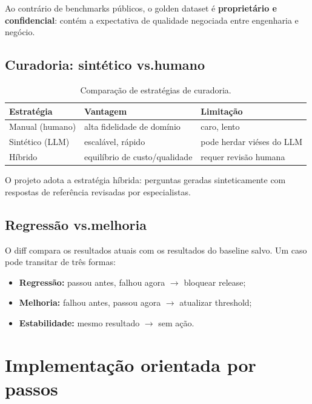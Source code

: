 Ao contr\'ario de benchmarks p\'ublicos, o golden dataset \'e
\textbf{propriet\'ario e confidencial}: cont\'em a expectativa de
qualidade negociada entre engenharia e neg\'ocio.

\subsection{Curadoria: sintético vs.\@ humano}

\begin{table}[htbp]
\centering
\caption{Compara\c{c}\~ao de estrat\'egias de curadoria.}
\label{tab:curadoria}
\begin{tabular}{lll}
\toprule
\textbf{Estrat\'egia} & \textbf{Vantagem} & \textbf{Limita\c{c}\~ao} \\
\midrule
Manual (humano)  & alta fidelidade de dom\'inio  & caro, lento \\
Sint\'etico (LLM) & escal\'avel, r\'apido         & pode herdar vi\'eses do LLM \\
H\'ibrido        & equil\'ibrio de custo/qualidade & requer revis\~ao humana \\
\bottomrule
\end{tabular}
\end{table}

O projeto adota a estrat\'egia h\'ibrida: perguntas geradas
sinteticamente com respostas de refer\^encia revisadas por
especialistas.

\subsection{Regress\~ao vs.\@ melhoria}

O diff compara os resultados atuais com os resultados do baseline
salvo. Um caso pode transitar de tr\^es formas:

\begin{itemize}[leftmargin=*]
  \item \textbf{Regress\~ao:} passou antes, falhou agora
        $\to$ bloquear release;
  \item \textbf{Melhoria:} falhou antes, passou agora
        $\to$ atualizar threshold;
  \item \textbf{Estabilidade:} mesmo resultado $\to$ sem a\c{c}\~ao.
\end{itemize}

\section{Implementa\c{c}\~ao orientada por passos}

